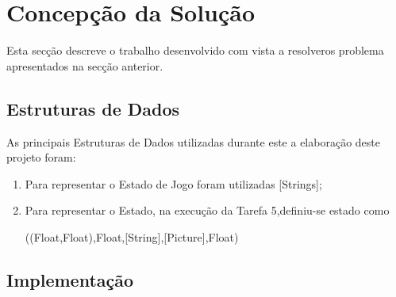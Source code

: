 \documentclass[a4paper]{article}
\begin{document}
\section{Concepção da Solução}
\label{sec:solucao}

Esta secção descreve o trabalho desenvolvido com vista a resolveros  problema apresentados na secção anterior.

\subsection{Estruturas de Dados}

As principais Estruturas de Dados utilizadas durante este a elaboração deste projeto foram:
\begin{enumerate}
\item Para representar o Estado de Jogo foram utilizadas [Strings];
\item Para representar o Estado, na execução da Tarefa 5,definiu-se estado como

((Float,Float),Float,[String],[Picture],Float)
\end{enumerate}

\subsection{Implementação}
\end{document}
